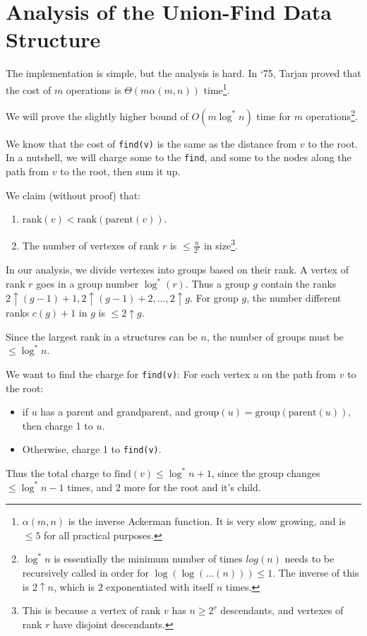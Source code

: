             \section{Analysis of the Union-Find Data Structure} %
            \label{sec:analysis_of_the_union_find_data_structure}
                The implementation is simple, but the analysis is hard.
                In `75, Tarjan proved that the cost of $m$ operations is $\Theta(m \alpha(m, n))$ time\footnote{$\alpha(m, n)$ is the inverse Ackerman function. It is very slow growing, and is $\le 5$ for all practical purposes.}.

                We will prove the slightly higher bound of $O(m \log^* n)$ time for $m$ operations\footnote{$\log^* n$ is essentially the minimum number of times $log(n)$ needs to be recursively called in order for $\log(\log(\ldots(n))) \le 1$. The inverse of this is $2\uparrow n$, which is $2$ exponentiated with itself $n$ times.}.

                We know that the cost of \verb|find(v)| is the same as the distance from $v$ to the root.
                In a nutshell, we will charge some to the \verb|find|, and some to the nodes along the path from $v$ to the root, then sum it up.

                We claim (without proof) that:
                \begin{enumerate}
                    \item $\text{rank}(v) < \text{rank}(\text{parent}(v))$.
                    \item The number of vertexes of rank $r$ is $\le \frac{n}{2^r}$ in size\footnote{This is because a vertex of rank $v$ has $n \ge 2^r$ descendants, and vertexes of rank $r$ have disjoint descendants.}.
                \end{enumerate}

                In our analysis, we divide vertexes into groups based on their rank.
                A vertex of rank $r$ goes in a group number $\log^*(r)$.
                Thus a group $g$ contain the ranks $2\uparrow(g-1) + 1, 2\uparrow(g-1) + 2, \ldots, 2\uparrow g$.
                For group $g$, the number different ranks $c(g)+1$ in $g$ is $\le 2 \uparrow g$.

                Since the largest rank in a structures can be $n$, the number of groups must be $\le \log^* n$.

                We want to find the charge for \verb|find(v)|:
                For each vertex $u$ on the path from $v$ to the root:
                \begin{itemize}
                    \item if $u$ has a parent and grandparent, and $\text{group$(u)$} = \text{group$(\text{parent$(u)$})$}$, then charge 1 to $u$.
                    \item Otherwise, charge 1 to \verb|find(v)|.
                \end{itemize}
                Thus the total charge to $\text{find$(v)$} \le \log^* n + 1$, since the group changes $\le \log^*n - 1$ times, and $2$ more for the root and it's child.

